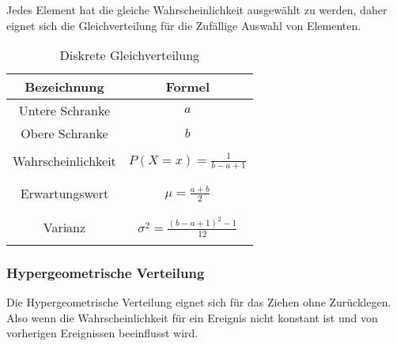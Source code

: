 \documentclass[12pt]{scrartcl}
\begin{document}
Jedes Element hat die gleiche Wahrscheinlichkeit ausgewählt zu werden,
daher eignet sich die Gleichverteilung für die Zufällige Auswahl von Elementen.

\begin{table}[h]
    \begin{tabular}{ | c | c | }
        \hline
        Bezeichnung        & Formel                              \\
        \hline
        Untere Schranke    & $a$                                 \\
        Obere Schranke     & $b$                                 \\
        \hline             &                                     \\
        Wahrscheinlichkeit & $P(X=x) = \frac{1}{b-a+1}$          \\&\\&\\
        Erwartungswert     & $\mu = \frac{a+b}{2}$               \\&\\&\\
        Varianz            & $\sigma^2 = \frac{(b-a+1)^2-1}{12}$ \\&\\
        \hline
    \end{tabular}
    \caption{Diskrete Gleichverteilung}
\end{table}

\pagebreak

\subsubsection{Hypergeometrische Verteilung}

Die Hypergeometrische Verteilung eignet sich für das Ziehen ohne Zurücklegen.
Also wenn die Wahrscheinlichkeit für ein Ereignis nicht konstant ist und von vorherigen Ereignissen beeinflusst wird.
\end{document}
